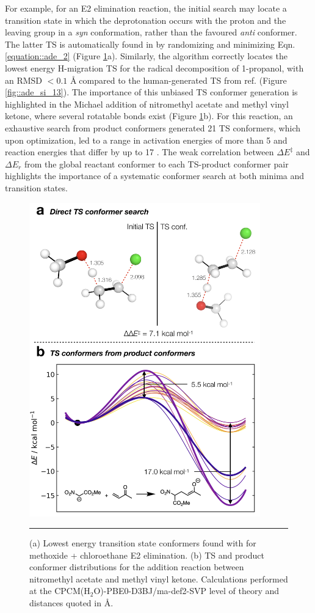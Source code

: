 \documentclass[../../main.tex]{subfiles}
\begin{document}
For example, for an E2 elimination reaction, the initial search may locate a transition state in which the deprotonation occurs with the proton and the leaving group in a \emph{syn} conformation, rather than the favoured \emph{anti} conformer. The latter TS is automatically found in \ade by randomizing and minimizing Eqn. \eqref{equation::ade_2} (Figure \ref{fig::ade_6}a). Similarly, the \ade algorithm correctly locates the lowest energy H-migration TS for the radical decomposition of 1-propanol, with an RMSD $< 0.1$ \AA$\;$compared to the human-generated TS from ref. \cite{Ferro-Costas2018} (Figure \ref{fig::ade_si_13}). The importance of this unbiased TS conformer generation is highlighted in the Michael addition of nitromethyl acetate and methyl vinyl ketone, where several rotatable bonds exist (Figure \ref{fig::ade_6}b). For this reaction, an exhaustive search from product conformers generated 21 TS conformers, which upon optimization, led to a range in activation energies of more than 5 \kcalx and reaction energies that differ by up to 17 \kcal. The weak correlation between $\Delta E^\ddagger$ and $\Delta E_r$ from the global reactant conformer to each TS-product conformer pair highlights the importance of a systematic conformer search at both minima and transition states.


\begin{figure}[h!]
	\vspace{0.4cm}
	\centering
	\includegraphics[width=10cm]{5/autode/figs/fig6}
	\vspace{0.4cm}
	\hrule
	\caption{(a) Lowest energy transition state conformers found with \ade for methoxide + chloroethane E2 elimination. (b) TS and product conformer distributions for the addition reaction between nitromethyl acetate and methyl vinyl ketone. Calculations performed at the CPCM(H$_2$O)-PBE0-D3BJ/ma-def2-SVP level of theory and distances quoted in \AA.}
	\label{fig::ade_6}
\end{figure}
\end{document}
